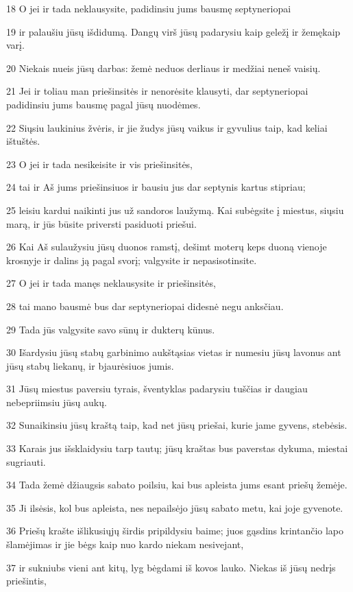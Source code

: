 \par 18 O jei ir tada neklausysite, padidinsiu jums bausmę septyneriopai 
\par 19 ir palaušiu jūsų išdidumą. Dangų virš jūsų padarysiu kaip geležį ir žemę­kaip varį. 
\par 20 Niekais nueis jūsų darbas: žemė neduos derliaus ir medžiai neneš vaisių. 
\par 21 Jei ir toliau man priešinsitės ir nenorėsite klausyti, dar septyneriopai padidinsiu jums bausmę pagal jūsų nuodėmes. 
\par 22 Siųsiu laukinius žvėris, ir jie žudys jūsų vaikus ir gyvulius taip, kad keliai ištuštės. 
\par 23 O jei ir tada nesikeisite ir vis priešinsitės, 
\par 24 tai ir Aš jums priešinsiuos ir bausiu jus dar septynis kartus stipriau; 
\par 25 leisiu kardui naikinti jus už sandoros laužymą. Kai subėgsite į miestus, siųsiu marą, ir jūs būsite priversti pasiduoti priešui. 
\par 26 Kai Aš sulaužysiu jūsų duonos ramstį, dešimt moterų keps duoną vienoje krosnyje ir dalins ją pagal svorį; valgysite ir nepasisotinsite. 
\par 27 O jei ir tada manęs neklausysite ir priešinsitės, 
\par 28 tai mano bausmė bus dar septyneriopai didesnė negu anksčiau. 
\par 29 Tada jūs valgysite savo sūnų ir dukterų kūnus. 
\par 30 Išardysiu jūsų stabų garbinimo aukštąsias vietas ir numesiu jūsų lavonus ant jūsų stabų liekanų, ir bjaurėsiuos jumis. 
\par 31 Jūsų miestus paversiu tyrais, šventyklas padarysiu tuščias ir daugiau nebepriimsiu jūsų aukų. 
\par 32 Sunaikinsiu jūsų kraštą taip, kad net jūsų priešai, kurie jame gyvens, stebėsis. 
\par 33 Karais jus išsklaidysiu tarp tautų; jūsų kraštas bus paverstas dykuma, miestai sugriauti. 
\par 34 Tada žemė džiaugsis sabato poilsiu, kai bus apleista jums esant priešų žemėje. 
\par 35 Ji ilsėsis, kol bus apleista, nes nepailsėjo jūsų sabato metu, kai joje gyvenote. 
\par 36 Priešų krašte išlikusiųjų širdis pripildysiu baime; juos gąsdins krintančio lapo šlamėjimas ir jie bėgs kaip nuo kardo niekam nesivejant, 
\par 37 ir sukniubs vieni ant kitų, lyg bėgdami iš kovos lauko. Niekas iš jūsų nedrįs priešintis, 
